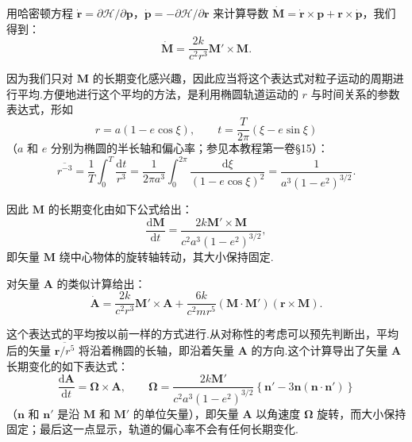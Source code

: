 \begin{xiti}
用哈密顿方程 $\dot{\boldsymbol{r}}=\partial\mathcal{H}/\partial\boldsymbol{p}$，$\dot{\boldsymbol{p}}=-\partial\mathcal{H}/\partial\boldsymbol{r}$ 来计算导数 $\dot{\boldsymbol{M}}=\dot{\boldsymbol{r}}\times\boldsymbol{p}+\boldsymbol{r}\times\dot{\boldsymbol{p}}$，我们得到：
\begin{equation}
  \dot{\boldsymbol{M}}
  =\frac{2k}{c^{2}r^{3}}\boldsymbol{M}'\times\boldsymbol{M}.
  \tag{2}
\end{equation}

因为我们只对 $\boldsymbol{M}$ 的长期变化感兴趣，因此应当将这个表达式对粒子运动的周期进行平均.方便地进行这个平均的方法，是利用椭圆轨道运动的 $r$ 与时间关系的参数表达式，形如
\begin{equation*}
  r=a(1-e\cos\xi),
  \qquad
  t=\frac{T}{2\pi}(\xi-e\sin\xi)
\end{equation*}
（$a$ 和 $e$ 分别为椭圆的半长轴和偏心率；参见本教程第一卷§15）：
\begin{equation*}
  \overline{r^{-3}}=\frac{1}{T}\int_{0}^{T}\frac{\mathrm{d}t}{r^{3}}
  =\frac{1}{2\pi a^{3}}\int_{0}^{2\pi}
  \frac{\mathrm{d}\xi}{(1-e\cos\xi)^{2}}
  =\frac{1}{a^{3}(1-e^{2})^{3/2}}.
\end{equation*}

因此 $\boldsymbol{M}$ 的长期变化由如下公式给出：
\begin{equation}
  \frac{\mathrm{d}\boldsymbol{M}}{\mathrm{d}t}
  =\frac{2k\boldsymbol{M}'\times\boldsymbol{M}}
  {c^{2}a^{3}(1-e^{2})^{3/2}},
  \tag{3}
\end{equation}
即矢量 $\boldsymbol{M}$ 绕中心物体的旋转轴转动，其大小保持固定.

对矢量 $\boldsymbol{A}$ 的类似计算给出：
\begin{equation*}
  \dot{\boldsymbol{A}}
  =\frac{2k}{c^{2}r^{3}}\boldsymbol{M}'\times\boldsymbol{A}
  +\frac{6k}{c^{2}mr^{5}}
  (\boldsymbol{M}\cdot\boldsymbol{M}')
  (\boldsymbol{r}\times\boldsymbol{M}).
\end{equation*}

这个表达式的平均按以前一样的方式进行.从对称性的考虑可以预先判断出，平均后的矢量 $\overline{\boldsymbol{r}/r^{5}}$ 将沿着椭圆的长轴，即沿着矢量 $\boldsymbol{A}$ 的方向.这个计算导出了矢量 $\boldsymbol{A}$ 长期变化的如下表达式：
\begin{equation}
  \frac{\mathrm{d}\boldsymbol{A}}{\mathrm{d}t}
  =\boldsymbol{\Omega}\times\boldsymbol{A},
  \qquad
  \boldsymbol{\Omega}
  =\frac{2k\boldsymbol{M}'}{c^{2}a^{3}(1-e^{2})^{3/2}}
  \left\{\boldsymbol{n}'-3\boldsymbol{n}(\boldsymbol{n}\cdot\boldsymbol{n}')
  \right\}
  \tag{4}
\end{equation}
（$\boldsymbol{n}$ 和 $\boldsymbol{n}'$ 是沿 $\boldsymbol{M}$ 和 $\boldsymbol{M}'$ 的单位矢量），即矢量 $\boldsymbol{A}$ 以角速度 $\boldsymbol{\Omega}$ 旋转，而大小保持固定；最后这一点显示，轨道的偏心率不会有任何长期变化.


\end{xiti}
